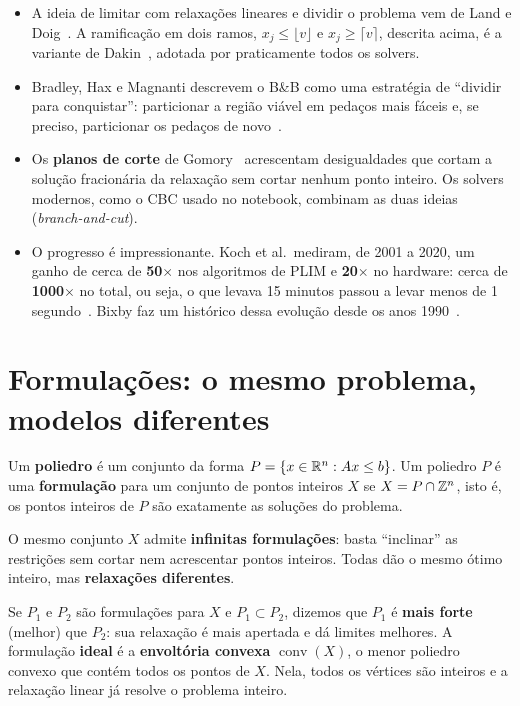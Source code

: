\begin{outros}
\begin{itemize}
  \item A ideia de limitar com relaxações lineares e dividir o problema vem de Land e Doig~\cite{landdoig1960}. A
  ramificação em dois ramos, $x_j\le\lfloor v\rfloor$ e $x_j\ge\lceil v\rceil$, descrita acima, é a variante de
  Dakin~\cite{dakin1965}, adotada por praticamente todos os solvers.
  \item Bradley, Hax e Magnanti descrevem o B\&B como uma estratégia de ``dividir para conquistar'': particionar a
  região viável em pedaços mais fáceis e, se preciso, particionar os pedaços de novo~\cite[Seç.~9.5]{amp}.
  \item Os \textbf{planos de corte} de Gomory~\cite{gomory1958} acrescentam desigualdades que cortam a solução
  fracionária da relaxação sem cortar nenhum ponto inteiro. Os solvers modernos, como o CBC usado no notebook,
  combinam as duas ideias (\emph{branch-and-cut}).
  \item O progresso é impressionante. Koch et al.\ mediram, de 2001 a 2020, um ganho de cerca de
  \textbf{50$\times$} nos algoritmos de PLIM e \textbf{20$\times$} no hardware: cerca de \textbf{1000$\times$} no
  total, ou seja, o que levava 15 minutos passou a levar menos de 1 segundo~\cite{koch2022}. Bixby faz um
  histórico dessa evolução desde os anos 1990~\cite{bixby2012}.
\end{itemize}
\end{outros}

\section{Formulações: o mesmo problema, modelos diferentes}
\label{sec:formulacoes}

\begin{definicao}
Um \textbf{poliedro} é um conjunto da forma $P=\{x\in\mathbb{R}^n : Ax\le b\}$. Um poliedro $P$ é uma \textbf{formulação}
para um conjunto de pontos inteiros $X$ se $X = P\cap\mathbb{Z}^n$, isto é, os pontos inteiros de $P$ são exatamente as
soluções do problema.
\end{definicao}

O mesmo conjunto $X$ admite \textbf{infinitas formulações}: basta ``inclinar'' as restrições sem cortar nem
acrescentar pontos inteiros. Todas dão o mesmo ótimo inteiro, mas \textbf{relaxações diferentes}.

\begin{definicao}
Se $P_1$ e $P_2$ são formulações para $X$ e $P_1\subset P_2$, dizemos que $P_1$ é \textbf{mais forte} (melhor) que
$P_2$: sua relaxação é mais apertada e dá limites melhores. A formulação \textbf{ideal} é a
\textbf{envoltória convexa} $\operatorname{conv}(X)$, o menor poliedro convexo que contém todos os pontos de
$X$. Nela, todos os vértices são inteiros e a relaxação linear já resolve o problema inteiro.
\end{definicao}


